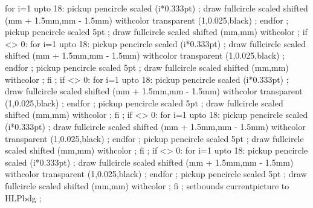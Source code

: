 for i=1 upto 18:
 	pickup pencircle scaled (i*0.333pt) ;
 	draw fullcircle scaled  shifted (mm + 1.5mm,mm - 1.5mm) withcolor transparent (1,0.025,black) ;
 endfor ;
pickup pencircle scaled 5pt ;
draw fullcircle scaled  shifted (mm,mm) withcolor  ;
if  <> 0:
	for i=1 upto 18:
 		pickup pencircle scaled (i*0.333pt) ;
 		draw fullcircle scaled  shifted (mm + 1.5mm,mm - 1.5mm) withcolor transparent (1,0.025,black) ;
	 endfor ;
	pickup pencircle scaled 5pt ;
	draw fullcircle scaled  shifted (mm,mm) withcolor  ;
fi ;
if  <> 0:
	for i=1 upto 18:
 		pickup pencircle scaled (i*0.333pt) ;
 		draw fullcircle scaled  shifted (mm + 1.5mm,mm - 1.5mm) withcolor transparent (1,0.025,black) ;
	 endfor ;
	pickup pencircle scaled 5pt ;
	draw fullcircle scaled  shifted (mm,mm) withcolor  ;
fi ;
if  <> 0:
	for i=1 upto 18:
 		pickup pencircle scaled (i*0.333pt) ;
 		draw fullcircle scaled  shifted (mm + 1.5mm,mm - 1.5mm) withcolor transparent (1,0.025,black) ;
	 endfor ;
	pickup pencircle scaled 5pt ;
	draw fullcircle scaled  shifted (mm,mm) withcolor  ;
fi ;
if  <> 0:
	for i=1 upto 18:
 		pickup pencircle scaled (i*0.333pt) ;
 		draw fullcircle scaled  shifted (mm + 1.5mm,mm - 1.5mm) withcolor transparent (1,0.025,black) ;
	 endfor ;
	pickup pencircle scaled 5pt ;
	draw fullcircle scaled  shifted (mm,mm) withcolor  ;
fi ;
setbounds currentpicture to HLPbdg ;
\stopuseMPgraphic

